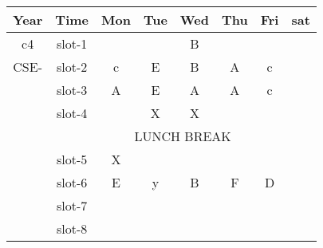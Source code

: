 \documentclass{article}
\begin{document}
	\begin{table}[h]
		
		\centering
	\begin{tabular}{|c|c|c|c|c|c|c|c|}
		\hline 
	\textbf{Year} & \textbf{Time} & \textbf{Mon} & \textbf{Tue} & \textbf{Wed} & \textbf{Thu} & \textbf{Fri} & \textbf{sat}\\
	\hline
	c4 & slot-1 &   &   & \cellcolor{red}B &   &   &\\
	\hline
	CSE- & slot-2 & \cellcolor{orange}c & \cellcolor{yellow}E & \cellcolor{red}B & \cellcolor{blue}A & \cellcolor{orange}c &  \\ 
	\hline
   
     & slot-3 & \cellcolor{blue}A & \cellcolor{yellow}E & \cellcolor{blue}A & \cellcolor{blue}A & \cellcolor{orange}c & \\
     \hline
      & slot-4 &  &  \cellcolor{green}X & \cellcolor{green}X &   &  & \\
      \hline
      &\multicolumn{7}{|c|}{LUNCH BREAK}\\
      \hline
      & slot-5 & \cellcolor{green}X &\cellcolor{brown} & \cellcolor{red}& \cellcolor{yellow}& \cellcolor{pink}&\\
      \hline
      & slot-6 & \cellcolor{yellow}E & \cellcolor{brown}y & \cellcolor{red}B & \cellcolor{yellow}F & \cellcolor{pink}D & \\
      \hline
      & slot-7 & & \cellcolor{brown} & \cellcolor{red} & \cellcolor{yellow} & \cellcolor{pink} &   \\
      \hline
      & slot-8 & & & & & & \\
      \hline
      
      
      
      
     
     
    
	
	
\end{tabular}
\label{tab:example}
		
	\end{table}	
\end{document}
